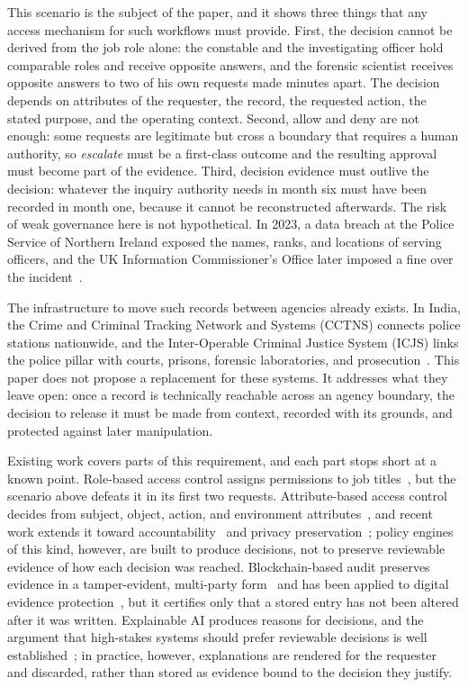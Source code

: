 This scenario is the subject of the paper, and it shows three things that any
access mechanism for such workflows must provide. First, the decision cannot
be derived from the job role alone: the constable and the investigating
officer hold comparable roles and receive opposite answers, and the forensic
scientist receives opposite answers to two of his own requests made minutes
apart. The decision depends on attributes of the requester, the record, the
requested action, the stated purpose, and the operating context. Second,
allow and deny are not enough: some requests are legitimate but cross a
boundary that requires a human authority, so \emph{escalate} must be a
first-class outcome and the resulting approval must become part of the
evidence. Third, decision evidence must outlive the decision: whatever the
inquiry authority needs in month six must have been recorded in month one,
because it cannot be reconstructed afterwards. The risk of weak governance
here is not hypothetical. In 2023, a data breach at the Police Service of
Northern Ireland exposed the names, ranks, and locations of serving officers,
and the UK Information Commissioner's Office later imposed a fine over the
incident~\cite{guardian_psni_breach_2023,ico_psni_fine_2024}.

The infrastructure to move such records between agencies already exists. In
India, the Crime and Criminal Tracking Network and Systems (CCTNS) connects
police stations nationwide, and the Inter-Operable Criminal Justice System
(ICJS) links the police pillar with courts, prisons, forensic laboratories,
and prosecution~\cite{pib_cctns_2026,mha_icjs_2026}. This paper does not
propose a replacement for these systems. It addresses what they leave open:
once a record is technically reachable across an agency boundary, the
decision to release it must be made from context, recorded with its grounds,
and protected against later manipulation.

Existing work covers parts of this requirement, and each part stops short at
a known point. Role-based access control assigns permissions to job
titles~\cite{sandhu_rbac_1996}, but the scenario above defeats it in its
first two requests. Attribute-based access control decides from subject,
object, action, and environment attributes~\cite{nist_abac_2014}, and recent
work extends it toward accountability~\cite{hu_accountable_private_ac_2024}
and privacy preservation~\cite{kerl_privacy_abac_2025}; policy engines of
this kind, however, are built to produce decisions, not to preserve
reviewable evidence of how each decision was reached. Blockchain-based audit
preserves evidence in a tamper-evident, multi-party
form~\cite{nist_blockchain_access_2022,androulaki_fabric_2018} and has been
applied to digital evidence
protection~\cite{banerjee_dashdikpala_2026,anbarasi_ai_criminal_justice_2026},
but it certifies only that a stored entry has not been altered after it was
written. Explainable AI produces reasons for decisions, and the argument that
high-stakes systems should prefer reviewable decisions is well
established~\cite{rudin_2019,zocholl_xai_law_enforcement_2025}; in practice,
however, explanations are rendered for the requester and discarded, rather
than stored as evidence bound to the decision they justify.

